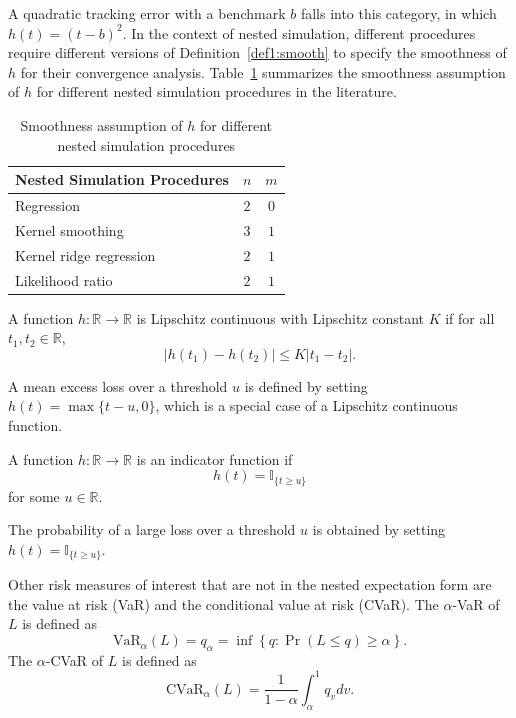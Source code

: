 A quadratic tracking error with a benchmark $b$ falls into this category, in which $h(t) = (t - b)^2$.
In the context of nested simulation, different procedures require different versions of Definition~\ref{def1:smooth} to specify the smoothness of $h$ for their convergence analysis.
Table~\ref{tab1:smoothness} summarizes the smoothness assumption of $h$ for different nested simulation procedures in the literature.

\begin{table}[ht!]
    \centering
    \begin{tabular}{lcc}
    \toprule
    \textbf{Nested Simulation Procedures} & $n$ & $m$ \\
    \midrule
    Regression & $2$ & $0$ \\
    Kernel smoothing & $3$ & $1$ \\
    Kernel ridge regression & $2$ & $1$ \\
    Likelihood ratio & $2$ & $1$ \\
    \bottomrule
    \end{tabular}
    \caption{Smoothness assumption of $h$ for different nested simulation procedures}
    \label{tab1:smoothness}
\end{table}

\begin{definition} \label{def1:lipschitz}
    A function $h: \mathbb{R} \rightarrow \mathbb{R}$ is Lipschitz continuous with Lipschitz constant $K$ if for all $t_1, t_2 \in \mathbb{R}$, 
    $$|h(t_1) - h(t_2)| \leq K|t_1 - t_2|.$$
\end{definition}

A mean excess loss over a threshold $u$ is defined by setting $h(t) = \max\{t - u, 0\}$, which is a special case of a Lipschitz continuous function.

\begin{definition} \label{def1:indicator}
    A function $h: \mathbb{R} \rightarrow \mathbb{R}$ is an indicator function if 
    $$h(t) = \mathbb{I}_{\{t \geq u\}}$$
    for some $u \in \mathbb{R}$.
\end{definition}

The probability of a large loss over a threshold $u$ is obtained by setting $h(t) = \mathbb{I}_{\{t \geq u\}}$.

Other risk measures of interest that are not in the nested expectation form are the value at risk (VaR) and the conditional value at risk (CVaR). 
The $\alpha$-VaR of $L$ is defined as
$$
    \mbox{VaR}_\alpha(L) = q_\alpha = \inf \left\{ q: \Pr(L\leq q) \geq \alpha \right\}.
$$
The $\alpha$-CVaR of $L$ is defined as
$$
    \mbox{CVaR}_\alpha(L) =\frac{1}{1-\alpha} \int_{\alpha}^{1} q_v dv. 
$$


